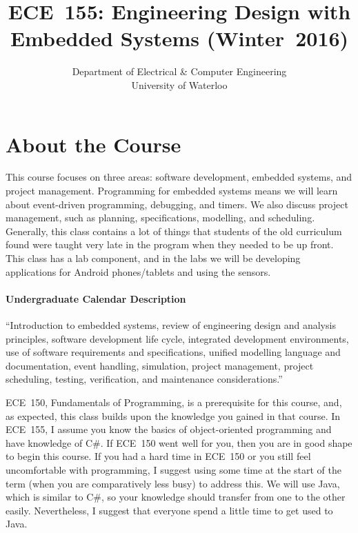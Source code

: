 \documentclass[letterpaper,10pt]{article}
\date{}
\title{\bf\LARGE ECE~155: Engineering Design with Embedded Systems (Winter~2016)}
\author{Department of Electrical \& Computer Engineering \\
                University of Waterloo}
\begin{document}
\maketitle
\vspace{-0.5in}

\section*{About the Course}

This course focuses on three areas: software development, embedded systems, and project management. Programming for embedded systems means we will learn about event-driven programming, debugging, and timers. We also discuss project management, such as planning, specifications, modelling, and scheduling. Generally, this class contains a lot of things that students of the old curriculum found were taught very late in the program when they needed to be up front. This class has a lab component, and in the labs we will be developing applications for Android phones/tablets and using the sensors.

\paragraph{Undergraduate Calendar Description} ``Introduction to embedded systems, review of engineering design and analysis principles, software development life cycle, integrated development environments, use of software requirements and specifications, unified modelling language and documentation, event handling, simulation, project management, project scheduling, testing, verification, and maintenance considerations.''

ECE~150, Fundamentals of Programming, is a prerequisite for this course, and, as expected, this class builds upon the knowledge you gained in that course. In ECE~155, I assume you know the basics of object-oriented programming and have knowledge of C\#. If ECE~150 went well for you, then you are in good shape to begin this course. If you had a hard time in ECE~150 or you still feel uncomfortable with programming, I suggest using some time at the start of the term (when you are comparatively less busy) to address this. We will use Java, which is similar to C\#, so your knowledge should transfer from one to the other easily. Nevertheless, I suggest that everyone spend a little time to get used to Java.
\end{document}
